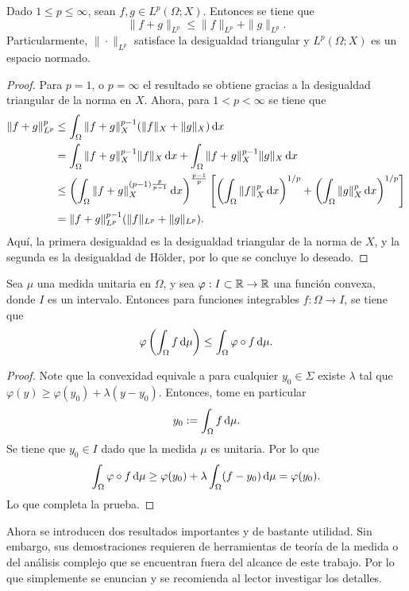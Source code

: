 \begin{proposition}
    Dado $1\leq p\leq\infty$, sean $f,g\in L^p(\Omega;X)$. Entonces se tiene que
    \begin{equation*}
        \|f+g\|_{L^p} \leq \|f\|_{L^p} +
        \|g\|_{L^p}.
    \end{equation*}
    Particularmente, $\|\cdot\|_{L^p}$ satisface la desigualdad triangular
    y $L^p(\Omega;X)$ es un espacio normado.
\end{proposition}
\begin{proof}
    Para $p=1$, o $p=\infty$ el resultado se obtiene gracias a la desigualdad
    triangular de la norma en $X$. Ahora, para $1<p<\infty$ 
    se tiene que
    \begin{align*}
        \|f+g\|_{L^p}^p & \leq \int_\Omega \|f+g\|_X^{p-1}(\|f\|_X+\|g\|_X)\mathop{}\!\mathrm{d} x\\
        & = \int_\Omega \|f+g\|_X^{p-1}\|f\|_X \mathop{}\!\mathrm{d} x + 
        \int_\Omega \|f+g\|_X^{p-1}\|g\|_X \mathop{}\!\mathrm{d} x \\
        & \leq \left( 
            \int_\Omega \|f+g\|_X^{(p-1) \frac{p}{p-1}} \mathop{}\!\mathrm{d} x 
        \right)^{\frac{p-1}{p}} \left[
            \left(\int_\Omega \|f\|_X^p\mathop{}\!\mathrm{d} x\right)^{1/p} +
            \left(\int_\Omega \|g\|_X^p\mathop{}\!\mathrm{d} x\right)^{1/p}
        \right] \\ 
        & = \|f+g\|_{L^p}^{p-1}(\|f\|_{L^p} + \|g\|_{L^p}).
    \end{align*}
    Aquí, la primera desigualdad es la desigualdad triangular de la norma de $X$, y la segunda es la desigualdad de H\"older, por lo que se concluye
    lo deseado.
\end{proof}
\begin{theorem}
	Sea $\mu$ una medida unitaria en $\Omega$, y sea $\varphi:I\subset\mathbb{R}\to\mathbb{R}$ una función convexa, donde $I$ es un intervalo. Entonces para funciones integrables  $f:\Omega\to I$, se tiene que 
	\begin{equation*}
		\varphi \left(\int_\Omega f\mathop{}\!\mathrm{d}\mu  \right) \leq \int_\Omega \varphi\circ f\mathop{}\!\mathrm{d}\mu.
	\end{equation*}
\end{theorem}
\begin{proof}
	Note que la convexidad equivale a para cualquier $y_0\in\Sigma$ existe $\lambda$ tal que $\varphi(y) \geq \varphi(y_0) + \lambda(y-y_0)$. Entonces, tome en particular
	\begin{equation*}
		y_0 := \int_\Omega f\mathop{}\!\mathrm{d}\mu.
	\end{equation*}
	Se tiene que $y_0\in I$ dado que la medida $\mu$ es unitaria. Por lo que 
	\begin{equation*}
		\int_\Omega \varphi\circ f\mathop{}\!\mathrm{d} \mu \geq \varphi(y_0) + \lambda \int_\Omega (f-y_0)\mathop{}\!\mathrm{d} \mu = \varphi(y_0).
	\end{equation*}
	Lo que completa la prueba.
\end{proof}
Ahora se introducen dos resultados importantes y de bastante utilidad. Sin embargo,
sus demostraciones requieren de herramientas de teoría de la medida o del 
análisis complejo que se encuentran fuera del alcance de este trabajo. Por lo que
simplemente se enuncian y se recomienda al lector investigar los detalles.

